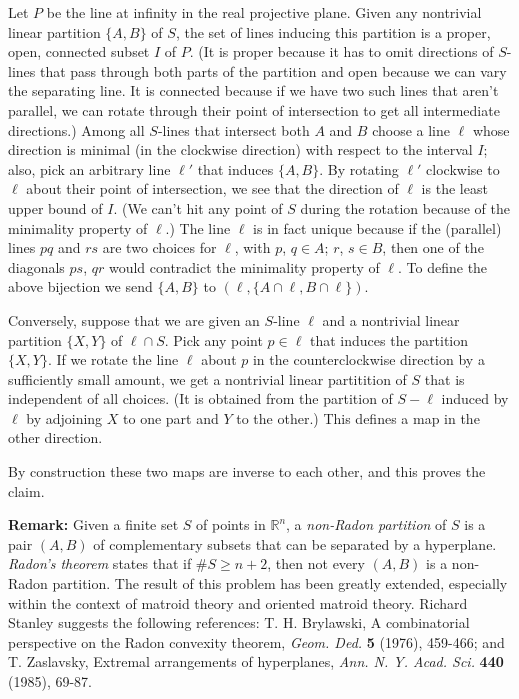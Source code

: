 \documentclass[amssymb,twocolumn,pra,10pt,aps]{revtex4-1}
\begin{document}
\begin{itemize}
Let $P$ be the line at infinity in the real projective plane. Given any nontrivial linear partition $\{A,B\}$ of $S$, the
set of lines inducing this partition is a proper, open, connected subset $I$ of $P$. (It is proper because it has to omit
directions of $S$-lines that pass through both parts of the partition and open because we can vary the separating line. It is
connected because if we have two such lines that aren't parallel, we can rotate through their point of intersection to
get all intermediate directions.) Among all $S$-lines that intersect both $A$ and $B$ choose a line $\ell$ whose direction is
minimal (in the clockwise direction) with respect to the interval $I$; also, pick an arbitrary line $\ell'$ that induces
$\{A,B\}$. By rotating $\ell'$ clockwise to $\ell$ about their point of intersection, we see that the direction
of $\ell$ is the least upper bound of $I$. (We can't hit any point of $S$ during the rotation because of the minimality
property of $\ell$.)  The line $\ell$ is in fact unique because if the (parallel) lines $pq$ and $rs$ are two choices for $\ell$,
with $p$, $q \in A$; $r$, $s \in B$, then one of the diagonals $ps$, $qr$ would contradict the minimality property of
$\ell$. To define the above bijection we send $\{A,B\}$ to $(\ell, \{A \cap \ell, B \cap \ell\})$.

Conversely, suppose that we are given an $S$-line $\ell$ and a nontrivial linear partition $\{X,Y\}$ of $\ell \cap S$.
Pick any point $p \in \ell$ that induces the partition $\{X,Y\}$. If we rotate the line $\ell$ about $p$ in the counterclockwise
direction by a sufficiently small amount, we get a nontrivial linear partitition of $S$ that is independent of all choices.
(It is obtained from the partition of $S-\ell$ induced by $\ell$ by adjoining $X$ to one part and $Y$ to the other.) This
defines a map in the other direction.

By construction these two maps are inverse to each other, and this proves the claim.


\textbf{Remark:}
Given a finite set $S$ of points in $\mathbb{R}^n$, a \emph{non-Radon partition}
of $S$ is a pair $(A,B)$
of complementary subsets that can be separated by
a hyperplane. \emph{Radon's theorem} states that if $\#S\geq n+2$, then not
every $(A,B)$ is a non-Radon partition. The result of this problem
has been greatly
extended, especially within the context of matroid theory and oriented
matroid theory. Richard Stanley suggests the following references:
T. H. Brylawski, A combinatorial
perspective on the Radon convexity theorem, \emph{Geom. Ded.} \textbf{5}
(1976),
459-466; and T. Zaslavsky, Extremal arrangements of hyperplanes,
\emph{Ann. N. Y. Acad. Sci.} \textbf{440} (1985), 69-87.


\end{itemize}
\end{document}
